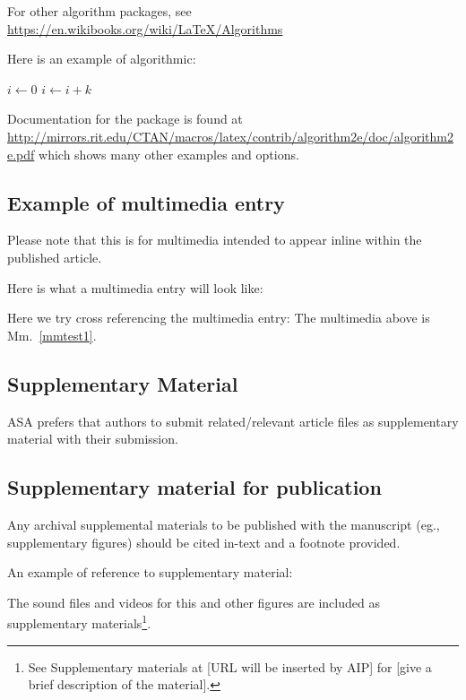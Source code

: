 \documentclass[reprint]{JASA}
\begin{document}
For other algorithm packages, see
\url{https://en.wikibooks.org/wiki/LaTeX/Algorithms}

Here is an example of algorithmic:


\begin{algorithmic}
    \State $i\gets 0$
\Else
        \State $i\gets i+k$
    \EndIf
\EndIf
\end{algorithmic}

Documentation for the package is found at 
\url{http://mirrors.rit.edu/CTAN/macros/latex/contrib/algorithm2e/doc/algorithm2e.pdf}
which shows many other examples and options.

\newpage
\subsection{Example of multimedia entry}
Please note that this is for multimedia intended to appear inline
within the published article. 

Here is what a multimedia entry will look like:
\label{mmtest1}

Here we try cross referencing the multimedia entry: The multimedia
above is Mm.~\ref{mmtest1}.

\subsection{Supplementary Material}
ASA
prefers that authors to submit related/relevant article files as
supplementary material with their submission.

\subsection{Supplementary material for publication}
Any archival supplemental materials to be published with the
manuscript (eg., supplementary figures) should be cited in-text and a footnote provided.

An example of reference to supplementary material:

The sound files and videos for this and other figures
are included as supplementary materials\footnote{See
Supplementary materials at [URL will be inserted by AIP]
for [give a brief description of the material].}.
\end{document}
